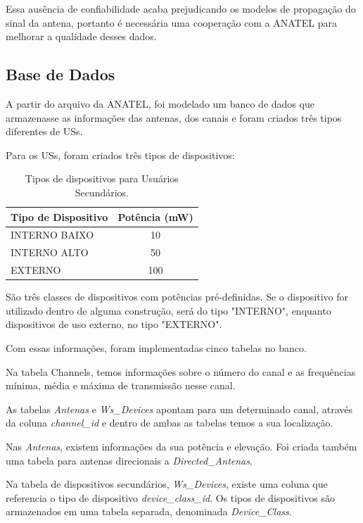 Essa ausência de confiabilidade acaba prejudicando os modelos de propagação do sinal da antena, portanto é necessária uma cooperação com a ANATEL para melhorar a qualidade desses dados.

\subsection{Base de Dados}

A partir do arquivo da ANATEL, foi modelado um banco de dados que armazenasse as informações das antenas, dos canais e foram criados três tipos diferentes de USs.

Para os USs, foram criados três tipos de dispositivos:

\begin{table}[h]
\centering
\caption[Tipos de dispositivos para Usuários Secundários.]
{Tipos de dispositivos para Usuários Secundários.} 
\label{table:wstypes}
\begin{tabular}{lc}

\hline
Tipo de Dispositivo          & Potência (mW)     \\ \hline
INTERNO BAIXO                & 10                \\
INTERNO ALTO                 & 50                \\
EXTERNO                      & 100                     
\end{tabular}
\end{table}

São três classes de dispositivos com potências pré-definidas. Se o dispositivo for utilizado dentro de alguma construção, será do tipo "INTERNO", enquanto dispositivos de uso externo, no tipo "EXTERNO".

Com essas informações, foram implementadas cinco tabelas no banco.

Na tabela Channels, temos informações sobre o número do canal e as frequências mínima, média e máxima de transmissão nesse canal.

As tabelas \textit{Antenas} e \textit{Ws\_Devices} apontam para um determinado canal, através da coluna \textit{channel\_id} e dentro de ambas as tabelas temos a sua localização.

Nas \textit{Antenas}, existem informações da sua potência e elevação. Foi criada também uma tabela para antenas direcionais a \textit{Directed\_Antenas}.

Na tabela de dispositivos secundários, \textit{Ws\_Devices}, existe uma coluna que referencia o tipo de dispositivo \textit{device\_class\_id}. Os tipos de dispositivos são armazenados em uma tabela separada, denominada \textit{Device\_Class}.

